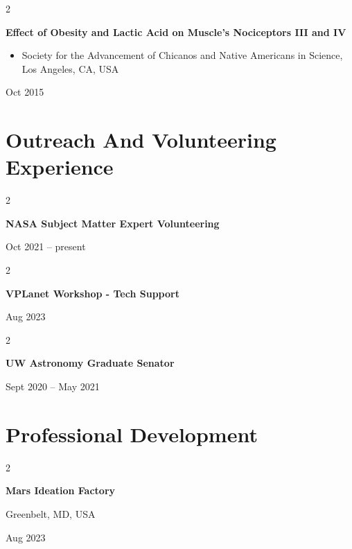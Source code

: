 \documentclass[10pt, letterpaper]{article}
\newenvironment{highlights}{
    \begin{itemize}[
        topsep=0.10 cm,
        parsep=0.10 cm,
        partopsep=0pt,
        itemsep=0pt,
        leftmargin=0.4 cm + 10pt
    ]
}{
    \end{itemize}
} %
\newenvironment{twocolentry}[2][]{
    \onecolentry
    \def\secondColumn{#2}
    \setcolumnwidth{\fill, 4.5 cm}
    \begin{paracol}{2}
}{
    \switchcolumn \raggedleft \secondColumn
    \end{paracol}
    \endonecolentry
} %
\begin{document}
        \begin{twocolentry}{
            Oct 2015
        }
            \textbf{Effect of Obesity and Lactic Acid on Muscle's Nociceptors III and IV}
            \begin{highlights}
                \item Society for the Advancement of Chicanos and Native Americans in Science, Los Angeles, CA, USA
            \end{highlights}
        \end{twocolentry}



    
    \section{Outreach And Volunteering Experience}



        
        \begin{twocolentry}{
            Oct 2021 – present
        }
            \textbf{NASA Subject Matter Expert Volunteering}
        \end{twocolentry}


        \vspace{0.2 cm}

        \begin{twocolentry}{
            Aug 2023
        }
            \textbf{VPLanet Workshop - Tech Support}
        \end{twocolentry}


        \vspace{0.2 cm}

        \begin{twocolentry}{
            Sept 2020 – May 2021
        }
            \textbf{UW Astronomy Graduate Senator}
        \end{twocolentry}



    
    \section{Professional Development}



        
        \begin{twocolentry}{
            Greenbelt, MD, USA

        Aug 2023
        }
            \textbf{Mars Ideation Factory}
        \end{twocolentry}
\end{document}
